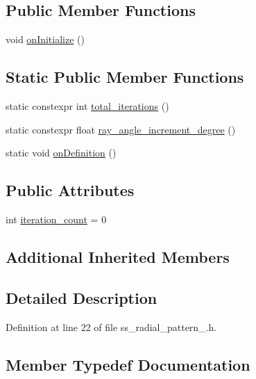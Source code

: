 \subsection*{Public Member Functions}
\begin{DoxyCompactItemize}
\item 
void \hyperlink{structsm__dance__bot__2_1_1SS1_1_1SsRadialPattern1_a4715089da2c09337a4aa4274bdbbe007}{on\+Initialize} ()
\end{DoxyCompactItemize}
\subsection*{Static Public Member Functions}
\begin{DoxyCompactItemize}
\item 
static constexpr int \hyperlink{structsm__dance__bot__2_1_1SS1_1_1SsRadialPattern1_ae01166957de9614acc10fc0af0c41480}{total\+\_\+iterations} ()
\item 
static constexpr float \hyperlink{structsm__dance__bot__2_1_1SS1_1_1SsRadialPattern1_a3fd9e633f6f74c33abf2521db0df6c88}{ray\+\_\+angle\+\_\+increment\+\_\+degree} ()
\item 
static void \hyperlink{structsm__dance__bot__2_1_1SS1_1_1SsRadialPattern1_a4d59aa72c347a614431272dcbb2cb786}{on\+Definition} ()
\end{DoxyCompactItemize}
\subsection*{Public Attributes}
\begin{DoxyCompactItemize}
\item 
int \hyperlink{structsm__dance__bot__2_1_1SS1_1_1SsRadialPattern1_a271a1f904960fed7e6a3fc8856ed0ed2}{iteration\+\_\+count} = 0
\end{DoxyCompactItemize}
\subsection*{Additional Inherited Members}


\subsection{Detailed Description}


Definition at line 22 of file ss\+\_\+radial\+\_\+pattern\+\_.\+h.



\subsection{Member Typedef Documentation}
